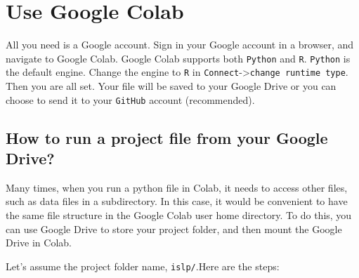 \documentclass[
  letterpaper,
  DIV=11,
  numbers=noendperiod]{scrreprt}
\begin{document}
\section{Use Google Colab}\label{use-google-colab}

All you need is a Google account. Sign in your Google account in a
browser, and navigate to Google Colab. Google Colab supports both
\texttt{Python} and \texttt{R}. \texttt{Python} is the default engine.
Change the engine to \texttt{R} in
\texttt{Connect}-\textgreater{}\texttt{change\ runtime\ type}. Then you
are all set. Your file will be saved to your Google Drive or you can
choose to send it to your \texttt{GitHub} account (recommended).

\subsection{How to run a project file from your Google
Drive?}\label{how-to-run-a-project-file-from-your-google-drive}

Many times, when you run a python file in Colab, it needs to access
other files, such as data files in a subdirectory. In this case, it
would be convenient to have the same file structure in the Google Colab
user home directory. To do this, you can use Google Drive to store your
project folder, and then mount the Google Drive in Colab.

Let's assume the project folder name, \texttt{islp/}.Here are the steps:
\end{document}
